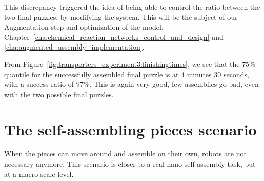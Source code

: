 This discrepancy triggered the idea of being able to control the ratio between the two final puzzles, by modifying the system. This will be the subject of our Augmentation step and optimization of the model, Chapter~\ref{cha:chemical_reaction_networks_control_and_design} and \ref{cha:augmented_assembly_implementation}.

From Figure~\ref{fig:transporters_experiment3:finishingtimes}, we see that the 75\% quantile for the successfully assembled final puzzle is at 4 minutes 30 seconds, with a success ratio of $97\%$. This is again very good, few assemblies go bad, even with the two possible final puzzles.


% 
% 


\section{The self-assembling pieces scenario} %
\label{sec:the_self_assembling_pieces_scenario}
When the pieces can move around and assemble on their own, robots are not necessary anymore. This scenario is closer to a real nano self-assembly task, but at a macro-scale level.

